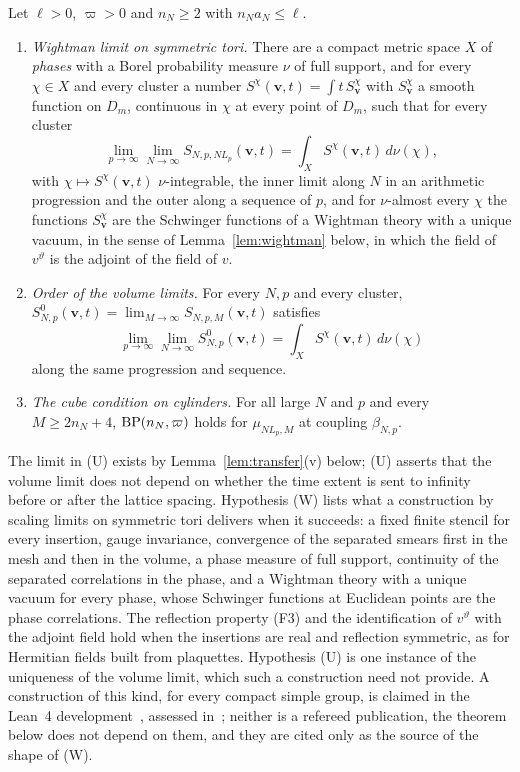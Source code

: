 \begin{definition}\label{def:WUD}
Let $\ell>0$, $\varpi>0$ and $n_N\ge2$ with $n_Na_N\le\ell$.
\begin{enumerate}[label=\textup{(\Alph*)},leftmargin=*]
\item[\textup{(W)}] \emph{Wightman limit on symmetric tori.} There are a compact
metric space $X$ of \emph{phases} with a Borel probability measure $\nu$ of
full support, and for every $\chi\in X$ and every cluster a number
$S^\chi(\mathbf v,t)=\int t\,S^\chi_{\mathbf v}$ with $S^\chi_{\mathbf v}$ a
smooth function on $D_m$, continuous in $\chi$ at every point of $D_m$, such
that for every cluster
\[
\lim_{p\to\infty}\lim_{N\to\infty}S_{N,p,NL_p}(\mathbf v,t)=\int_X S^\chi(\mathbf v,t)
\,d\nu(\chi),
\]
with $\chi\mapsto S^\chi(\mathbf v,t)$ $\nu$-integrable, the inner limit along
$N$ in an arithmetic progression and the outer along a sequence of $p$, and
for $\nu$-almost every $\chi$ the functions
$S^\chi_{\mathbf v}$ are the Schwinger functions of a Wightman theory with
a unique vacuum, in the sense of Lemma~\ref{lem:wightman} below, in which
the field of $v^\vartheta$ is the adjoint of the field of $v$.
\item[\textup{(U)}] \emph{Order of the volume limits.} For every $N,p$ and
every cluster, $S^0_{N,p}(\mathbf v,t)=\lim_{M\to\infty}S_{N,p,M}(\mathbf v,t)$
satisfies
\[
\lim_{p\to\infty}\lim_{N\to\infty}S^0_{N,p}(\mathbf v,t)=\int_XS^\chi(\mathbf v,t)
\,d\nu(\chi)
\]
along the same progression and sequence.
\item[\textup{(D$_\ell$)}] \emph{The cube condition on cylinders.} For all large
$N$ and $p$ and every $M\ge2n_N+4$, $\mathrm{BP}(n_N,\varpi)$ holds for $\mu_{NL_p,M}$
at coupling $\beta_{N,p}$.
\end{enumerate}
\end{definition}

The limit in (U) exists by Lemma~\ref{lem:transfer}(v) below; (U) asserts
that the volume limit does not depend on whether the time extent is sent to
infinity before or after the lattice spacing. Hypothesis (W) lists what a
construction by scaling limits on symmetric tori delivers when it succeeds:
a fixed finite stencil for every insertion, gauge invariance, convergence of
the separated smears first in the mesh and then in the volume, a phase
measure of full support, continuity of the separated correlations in the
phase, and a Wightman theory with a unique vacuum for every phase, whose
Schwinger functions at Euclidean points are the phase correlations. The
reflection property (F3) and the identification of $v^\vartheta$ with the
adjoint field hold when the insertions are real and reflection symmetric, as
for Hermitian fields built from plaquettes. Hypothesis (U) is one instance
of the uniqueness of the volume limit, which such a construction need not
provide. A construction of this kind, for every compact simple group, is
claimed in the Lean~4 development~\cite{OAI26}, assessed in~\cite{YMG26};
neither is a refereed publication, the theorem below does not depend on
them, and they are cited only as the source of the shape of (W).

